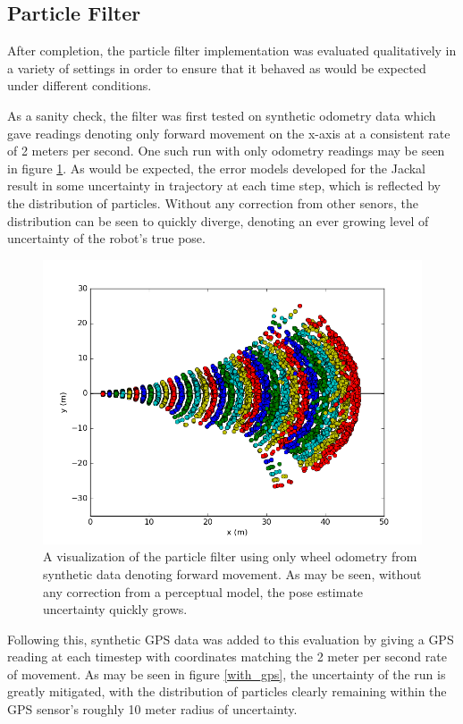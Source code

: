 \documentclass[letterpaper, 12 pt, conference]{ieeeconf}  %
\begin{document}
\subsection{Particle Filter}

After completion, the particle filter implementation was evaluated qualitatively in a variety of settings in order to ensure that it behaved as would be expected under different conditions. 
\par
As a sanity check, the filter was first tested on synthetic odometry data which gave readings denoting only forward movement on the x-axis at a consistent rate of 2 meters per second. One such run with only odometry readings may be seen in figure \ref{odometry_error}. As would be expected, the error models developed for the Jackal result in some uncertainty in trajectory at each time step, which is reflected by the distribution of particles. Without any correction from other senors, the distribution can be seen to quickly diverge, denoting an ever growing level of uncertainty of the robot's true pose. 

\begin{figure}[h]
\centering
\includegraphics[scale=0.60]{NO_GPS}
\caption{A visualization of the particle filter using only wheel odometry from synthetic data denoting forward movement. As may be seen, without any correction from a perceptual model, the pose estimate uncertainty quickly grows.}
\label{odometry_error}
\end{figure}

Following this, synthetic GPS data was added to this evaluation by giving a GPS reading at each timestep with coordinates matching the 2 meter per second rate of movement. As may be seen in figure \ref{with_gps}, the uncertainty of the run is greatly mitigated, with the distribution of particles clearly remaining within the GPS sensor's roughly 10 meter radius of uncertainty. 
\end{document}

